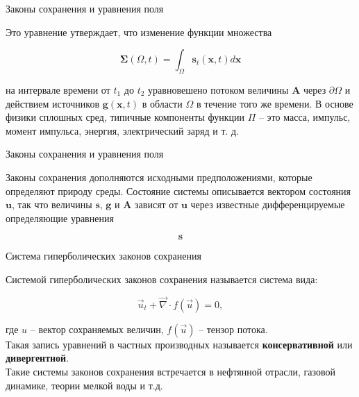\documentclass[10pt,xcolor=pst,aspectratio=169]{beamer}
\begin{document}
\begin{frame}{Законы сохранения и уравнения поля}

    \transdissolve[duration=0.1]
    \justifying
    \large

    Это уравнение утверждает, что изменение функции множества

    \[
        \bm{\Sigma} \left( \Omega, t \right) = \int_{\Omega} \mathbf{s}_{t} \left( \mathbf{x}, t \right) d \mathbf{x}
    \]

    на интервале времени от $t_{1}$ до $t_{2}$ уравновешено потоком величины $\mathbf{A}$ через $\partial \Omega$ и действием источников $\mathbf{g} \left( \mathbf{x}, t \right)$ в области $\Omega$ в течение того же времени. В основе физики сплошных сред, типичные компоненты функции $\Pi$ -- это масса, импульс, момент импульса, энергия, электрический заряд и т. д.

\end{frame}

\begin{frame}{Законы сохранения и уравнения поля}

    \transdissolve[duration=0.1]
    \justifying
    \large

    Законы сохранения дополняются исходными предположениями, которые определяют природу среды. Состояние системы описывается вектором состояния $\mathbf{u}$, так что величины $\mathbf{s}$, $\mathbf{g}$ и $\mathbf{A}$ зависят от $\mathbf{u}$ через известные дифференцируемые определяющие уравнения

    \[
        \mathbf{s}
    \]


\end{frame}

\begin{frame}{Система гиперболических законов сохранения}

    \transdissolve[duration=0.1]
    \justifying
    \large

    Системой гиперболических законов сохранения называется система вида:

    \[
        \vec{u}_{t} + \vec{\nabla} \cdot f \left( \vec{u} \right) = 0,
    \]

    где $u$ -- вектор сохраняемых величин, $f \left( \vec{u} \right)$ -- тензор потока.\\

    Такая запись уравнений в частных производных называется \textbf{консервативной} или \textbf{дивергентной}.\\

    Такие системы законов сохранения встречается в нефтянной отрасли, газовой динамике, теории мелкой воды и т.д.\\

\end{frame}
\end{document}

